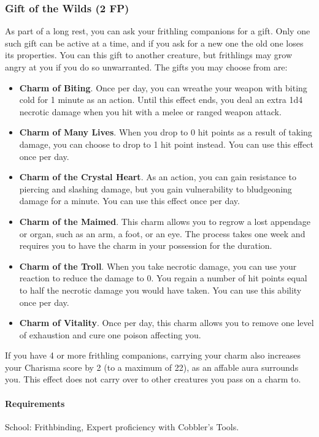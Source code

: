 \subsubsection{Gift of the Wilds (2 FP)} \label{feat::giftofthewilds}
    As part of a long rest, you can ask your frithling companions for a gift.
    Only one such gift can be active at a time, and if you ask for a new one the old one loses its properties.
    You can this gift to another creature, but frithlings may grow angry at you if you do so unwarranted.
    The gifts you may choose from are:
    \begin{itemize}
        \item \textbf{Charm of Biting}.
        Once per day, you can wreathe your weapon with biting cold for 1 minute as an action.
        Until this effect ends, you deal an extra 1d4 necrotic damage when you hit with a melee or ranged weapon attack.
        \item \textbf{Charm of Many Lives}.
        When you drop to 0 hit points as a result of taking damage, you can choose to drop to 1 hit point instead.
        You can use this effect once per day.
        \item \textbf{Charm of the Crystal Heart}.
        As an action, you can gain resistance to piercing and slashing damage, but you gain vulnerability to bludgeoning damage for a minute.
        You can use this effect once per day.
        \item \textbf{Charm of the Maimed}.
        This charm allows you to regrow a lost appendage or organ, such as an arm, a foot, or an eye.
        The process takes one week and requires you to have the charm in your possession for the duration.
        \item \textbf{Charm of the Troll}.
        When you take necrotic damage, you can use your reaction to reduce the damage to 0.
        You regain a number of hit points equal to half the necrotic damage you would have taken.
        You can use this ability once per day.
        \item \textbf{Charm of Vitality}.
        Once per day, this charm allows you to remove one level of exhaustion and cure one poison affecting you.
    \end{itemize}

    If you have 4 or more frithling companions, carrying your charm also increases your Charisma score by 2 (to a maximum of 22), as an affable aura surrounds you.
    This effect does not carry over to other creatures you pass on a charm to.
    \paragraph{Requirements} School: Frithbinding, Expert proficiency with Cobbler's Tools.
